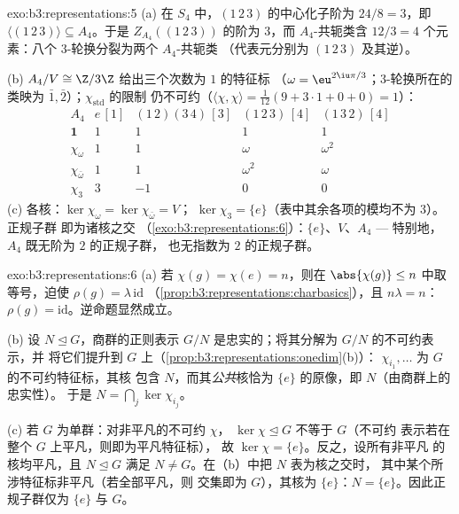 \begin{solution}{exo:b3:representations:5}
(a) 在 $S_4$ 中，$(1\,2\,3)$ 的中心化子阶为 $24/8 =
3$，即 $\langle(1\,2\,3)\rangle \subseteq A_4$。于是
$Z_{A_4}((1\,2\,3))$ 的阶为 $3$，而 $A_4$-共轭类含 $12/3
= 4$ 个元素：八个 $3$-轮换分裂为两个 $A_4$-共轭类
（代表元分别为 $(1\,2\,3)$ 及其逆）。

(b) $A_4/V \cong \Z/3\Z$ 给出三个次数为 $1$ 的特征标
（$\omega = \eu^{2\iu\pi/3}$；$3$-轮换所在的类映为
$\bar1, \bar2$）；$\chi_{\mathrm{std}}$ 的限制
仍不可约（$\langle\chi,\chi\rangle = \frac1{12}(9 + 3
\cdot 1 + 0 + 0) = 1$）：
\[
\begin{array}{c|cccc}
A_4 & e\,[1] & (1\,2)(3\,4)\,[3] & (1\,2\,3)\,[4] &
(1\,3\,2)\,[4]\\
\hline
\mathbf 1 & 1 & 1 & 1 & 1\\
\chi_\omega & 1 & 1 & \omega & \omega^2\\
\chi_{\bar\omega} & 1 & 1 & \omega^2 & \omega\\
\chi_3 & 3 & -1 & 0 & 0
\end{array}
\]
(c) 各核：$\ker\chi_\omega = \ker\chi_{\bar\omega} = V$；
$\ker\chi_3 = \{e\}$（表中其余各项的模均不为 $3$）。正规子群
即为诸核之交
（\cref{exo:b3:representations:6}）：$\{e\}$、$V$、$A_4$ --- 特别地，
$A_4$ 既无阶为 $2$ 的正规子群，
也无指数为 $2$ 的正规子群。
\end{solution}

\begin{solution}{exo:b3:representations:6}
(a) 若 $\chi(g) = \chi(e) = n$，则在
$\abs{\chi(g)} \leq n$ 中取等号，迫使 $\rho(g) = \lambda\,\mathrm{id}$
（\cref{prop:b3:representations:charbasics}），且 $n\lambda = n$：
$\rho(g) = \mathrm{id}$。逆命题显然成立。

(b) 设 $N \trianglelefteq G$，商群的正则表示
$G/N$ 是忠实的；将其分解为 $G/N$ 的不可约表示，并
将它们提升到 $G$ 上（\cref{prop:b3:representations:onedim}(b)）：
$\chi_{i_1}, \dots$ 为 $G$ 的不可约特征标，其核
包含 $N$，而其\emph{公共}核恰为
$\{e\}$ 的原像，即 $N$（由商群上的忠实性）。
于是 $N = \bigcap_j \ker\chi_{i_j}$。

(c) 若 $G$ 为单群：对非平凡的不可约 $\chi$，
$\ker\chi \trianglelefteq G$ 不等于 $G$（不可约
表示若在整个 $G$ 上平凡，则即为平凡特征标），
故 $\ker\chi = \{e\}$。反之，设所有非平凡
的核均平凡，且 $N \trianglelefteq G$ 满足 $N \neq
G$。在（b）中把 $N$ 表为核之交时，
其中某个所涉特征标非平凡（若全部平凡，则
交集即为 $G$），其核为 $\{e\}$：$N =
\{e\}$。因此正规子群仅为 $\{e\}$ 与 $G$。
\end{solution}

